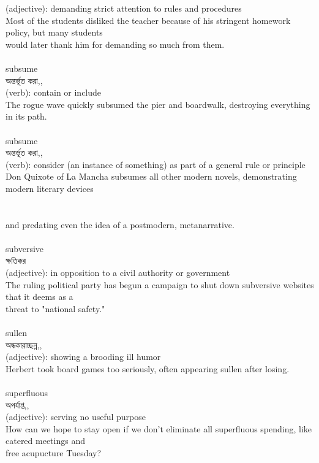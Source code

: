 \documentclass{article}
\begin{document}
{(adjective): demanding strict attention to rules and procedures\\Most of the students disliked the teacher because of his stringent homework policy, but many students\\would later thank him for demanding so much from them.\\}\\
{subsume}\\
{অন্তর্ভূত করা,,}\\
{(verb): contain or include\\The rogue wave quickly subsumed the pier and boardwalk, destroying everything in its path.\\}\\
{subsume}\\
{অন্তর্ভূত করা,,}\\
{(verb): consider (an instance of something) as part of a general rule or principle\\Don Quixote of La Mancha subsumes all other modern novels, demonstrating modern literary devices\\\\                                                                             \\and predating even the idea of a postmodern, metanarrative.\\}\\
{subversive}\\
{ক্ষতিকর}\\
{(adjective): in opposition to a civil authority or government\\The ruling political party has begun a campaign to shut down subversive websites that it deems as a\\threat to "national safety."\\}\\
{sullen}\\
{অন্ধকারাচ্ছন্ন,,}\\
{(adjective): showing a brooding ill humor\\Herbert took board games too seriously, often appearing sullen after losing.\\}\\
{superfluous}\\
{অপর্যাপ্ত,,}\\
{(adjective): serving no useful purpose\\How can we hope to stay open if we don't eliminate all superfluous spending, like catered meetings and\\free acupucture Tuesday?\\}\\
\end{document}
